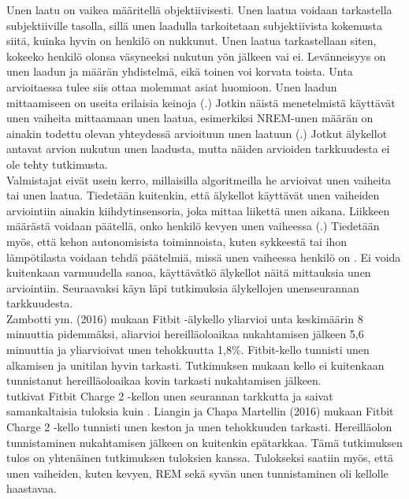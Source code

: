 \documentclass[utf8,bachelor,finnish]{bachelor}
\begin{document}
  Unen laatu on vaikea määritellä objektiivisesti. Unen laatua voidaan tarkastella subjektiiville tasolla, sillä unen laadulla tarkoitetaan subjektiivista kokemusta siitä, kuinka hyvin on henkilö on nukkunut.
   Unen laatua tarkastellaan siten, kokeeko henkilö olonsa väsyneeksi nukutun yön jälkeen vai ei. Levänneisyys on
    unen laadun ja määrän yhdistelmä, eikä toinen voi korvata toista. Unta arvioitaessa tulee siis ottaa molemmat asiat huomioon.
     Unen laadun mittaamiseen on useita erilaisia keinoja (\cite{kohyama_which_2021}.)
      Jotkin näistä menetelmistä käyttävät unen vaiheita mittaamaan unen laatua, esimerkiksi
       NREM-unen määrän on ainakin todettu olevan yhteydessä arvioituun unen laatuun (\cite{krystal_measuring_2008}.)
        Jotkut älykellot antavat arvion nukutun unen laadusta, mutta näiden arvioiden tarkkuudesta ei ole tehty tutkimusta.\\
  
  Valmistajat eivät usein kerro, millaisilla algoritmeilla he arvioivat unen vaiheita tai unen laatua.
   Tiedetään kuitenkin, että älykellot käyttävät unen vaiheiden arviointiin ainakin kiihdytinsensoria, joka mittaa liikettä unen aikana. Liikkeen määrästä voidaan
    päätellä, onko henkilö kevyen unen vaiheessa (\cite{grifantini_hows_2014,de_zambotti_measures_2016}.)
     Tiedetään myös, että kehon autonomisista toiminnoista, kuten sykkeestä tai ihon lämpötilasta voidaan tehdä päätelmiä, missä
      unen vaiheessa henkilö on \parencite{de_zambotti_measures_2016, fonseca_sleep_2015}. Ei voida kuitenkaan varmuudella sanoa, käyttävätkö älykellot näitä mittauksia unen arviointiin.
       Seuraavaksi käyn läpi tutkimuksia älykellojen unenseurannan tarkkuudesta.\\
    
       

   Zambotti ym. (2016) mukaan Fitbit -älykello yliarvioi unta keskimäärin
    8 minuuttia pidemmäksi, aliarvioi hereilläoloaikaa nukahtamisen jälkeen 5,6 minuuttia ja yliarvioivat unen tehokkuutta 1,8\%.
     Fitbit-kello tunnisti unen alkamisen ja unitilan hyvin tarkasti.
      Tutkimuksen mukaan kello ei kuitenkaan tunnistanut hereilläoloaikaa kovin tarkasti nukahtamisen jälkeen.\\
  
  \textcite{liang2018validity} tutkivat Fitbit Charge 2 -kellon unen seurannan tarkkutta ja saivat samankaltaisia tuloksia
   kuin \textcite{de_zambotti_measures_2016}. Liangin ja Chapa Martellin (2016) mukaan Fitbit Charge 2 -kello tunnisti unen keston
    ja unen tehokkuuden tarkasti. Hereilläolon tunnistaminen nukahtamisen jälkeen on kuitenkin
     epätarkkaa. Tämä tutkimuksen tulos on yhtenäinen \textcite{de_zambotti_measures_2016} tutkimuksen tuloksien kanssa.
      Tulokseksi saatiin myös, että unen vaiheiden, kuten kevyen, REM sekä syvän unen tunnistaminen oli kellolle haastavaa.\\
  
\end{document}
